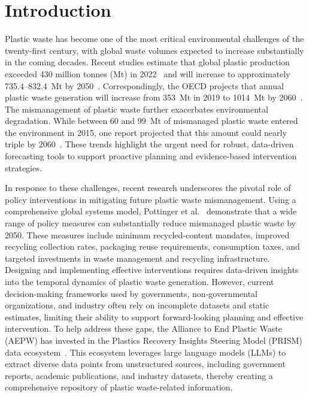 \section{Introduction}

Plastic waste has become one of the most critical environmental challenges of the twenty-first century, with global waste volumes expected to increase substantially in the coming decades.
Recent studies estimate that global plastic production exceeded 430 million tonnes (Mt) in 2022~\cite{houssini2025complexities} and will increase to approximately 735.4--832.4~Mt by 2050~\cite{dokl2024global}.
Correspondingly, the OECD projects that annual plastic waste generation will increase from 353~Mt in 2019 to 1014~Mt by 2060~\cite{oecd2022PlasticWaste2060}.
The mismanagement of plastic waste further exacerbates environmental degradation.
While between 60 and 99~Mt of mismanaged plastic waste entered the environment in 2015, one report projected that this amount could nearly triple by 2060~\cite{lebreton2019future}.
These trends highlight the urgent need for robust, data-driven forecasting tools to support proactive planning and evidence-based intervention strategies.

In response to these challenges, recent research underscores the pivotal role of policy interventions in mitigating future plastic waste mismanagement.
Using a comprehensive global systems model, Pottinger et al.~\cite{pottinger2024pathways} demonstrate that a wide range of policy measures can substantially reduce mismanaged plastic waste by 2050.
These measures include minimum recycled-content mandates, improved recycling collection rates, packaging reuse requirements, consumption taxes, and targeted investments in waste management and recycling infrastructure.
Designing and implementing effective interventions requires data-driven insights into the temporal dynamics of plastic waste generation.
However, current decision-making frameworks used by governments, non-governmental organizations, and industry often rely on incomplete datasets and static estimates, limiting their ability to support forward-looking planning and effective intervention.
To help address these gaps, the Alliance to End Plastic Waste (AEPW) has invested in the Plastics Recovery Insights Steering Model (PRISM) data ecosystem~\cite{edie2023IBMPrismPlatform}.
This ecosystem leverages large language models (LLMs) to extract diverse data points from unstructured sources, including government reports, academic publications, and industry datasets, thereby creating a comprehensive repository of plastic waste-related information.

